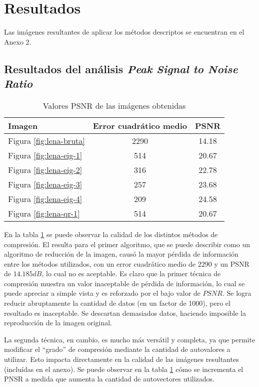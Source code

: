 \documentclass[twocolumn,a4paper,10pt]{article}
\begin{document}
\section{Resultados}
\label{sec:resultados}

Las imágenes resultantes de aplicar los métodos descriptos se encuentran en el Anexo 2.

\subsection{Resultados del análisis \textit{Peak Signal to Noise Ratio}}

\begin{table}[H]
    \center
    \begin{tabular}{l|c|c}
        Imagen & Error cuadr\'atico medio & PSNR \\
        \hline

        Figura \ref{fig:lena-bruta} & 2290 & 14.18 \\
        Figura \ref{fig:lena-eig-1} & 514  & 20.67 \\
        Figura \ref{fig:lena-eig-2} & 316  & 22.78 \\
        Figura \ref{fig:lena-eig-3} & 257  & 23.68 \\
        Figura \ref{fig:lena-eig-4} & 209  & 24.58 \\
        Figura \ref{fig:lena-qr-1}  & 514  & 20.67 \\

    \end{tabular}
    \caption{Valores PSNR de las imágenes obtenidas}
    \label{tab:psnr}
\end{table}

En la tabla \ref{tab:psnr} se puede observar la calidad de los distintos m\'etodos de compresi\'on.
El resulta para el primer algoritmo, que se puede describir como un algoritmo de reducción de la imagen, causó la mayor pérdida de información entre los 
métodos utilizados, con un error cuadrático medio de $2290$ y un PSNR de $14.185 dB$, lo cual no es aceptable.
Es claro que la primer t\'ecnica de compresi\'on muestra un valor inaceptable de pérdida de información, lo cual se puede apreciar a simple vista y es 
reforzado por el bajo valor de $PSNR$. Se logra reducir abruptamente la cantidad de datos (en un factor de 1000), pero el resultado es inaceptable. 
Se descartan demasiados datos, haciendo imposible la reproducci\'on de la imagen original.

La segunda t\'ecnica, en cambio, es mucho m\'as vers\'atil y completa, ya que permite modificar el ``grado'' de compresi\'on mediante la cantidad de autovalores 
a utilizar.  Esto impacta directamente en la calidad de las imágenes resultantes (incluídas en el anexo). Se puede observar en la tabla \ref{tab:psnr} cómo 
se incrementa el PNSR a medida que aumenta la cantidad de autovectores utilizados.
\end{document}
